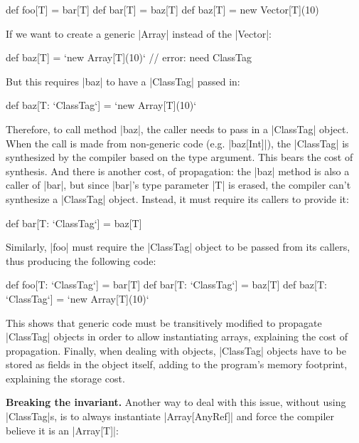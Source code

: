 \begin{lstlisting-nobreak}
 def foo[T] = bar[T]
 def bar[T] = baz[T]
 def baz[T] = new Vector[T](10)
\end{lstlisting-nobreak}

If we want to create a generic |Array| instead of the |Vector|:

\begin{lstlisting-nobreak}
 def baz[T] = `new Array[T](10)` // error: need ClassTag
\end{lstlisting-nobreak}

But this requires |baz| to have a |ClassTag| passed in:

\begin{lstlisting-nobreak}
 def baz[T: `ClassTag`] = `new Array[T](10)`
\end{lstlisting-nobreak}

Therefore, to call method |baz|, the caller needs to pass in a |ClassTag| object. When the call is made from non-generic code (e.g. |baz[Int]|), the |ClassTag| is synthesized by the compiler based on the type argument. This bears the cost of synthesis. And there is another cost, of propagation: the |baz| method is also a caller of |bar|, but since |bar|'s  type parameter |T| is erased, the compiler can't synthesize a |ClassTag| object. Instead, it must require its callers to provide it:

\begin{lstlisting-nobreak}
 def bar[T: `ClassTag`] = baz[T]
\end{lstlisting-nobreak}

Similarly, |foo| must require the |ClassTag| object to be passed from its callers, thus producing the following code:

\begin{lstlisting-nobreak}
 def foo[T: `ClassTag`] = bar[T]
 def bar[T: `ClassTag`] = baz[T]
 def baz[T: `ClassTag`] = `new Array[T](10)`
\end{lstlisting-nobreak}

This shows that generic code must be transitively modified to propagate |ClassTag| objects in order to allow instantiating arrays, explaining the cost of propagation. Finally, when dealing with objects, |ClassTag| objects have to be stored as fields in the object itself, adding to the program's memory footprint, explaining the storage cost.

\textbf{Breaking the invariant.} Another way to deal with this issue, without using |ClassTag|s, is to always instantiate |Array[AnyRef]| and force the compiler believe it is an |Array[T]|:

